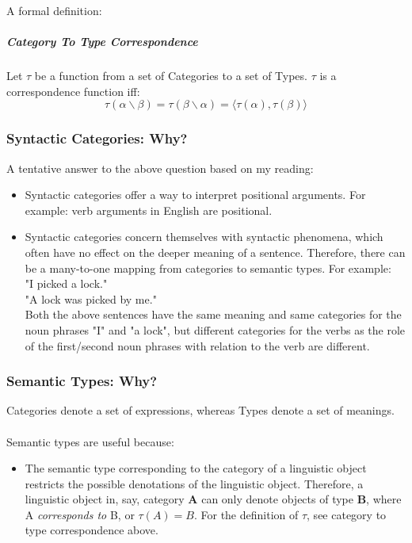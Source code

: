 \documentclass[letterpaper,12pt]{article}
\begin{document}
A formal definition:

\subparagraph{Category To Type Correspondence}
Let $\tau$ be a function from a set of Categories to a set of Types. $\tau$ is a correspondence function iff: 
\begin{equation}
\tau ( \alpha \backslash \beta ) = \tau ( \beta \backslash \alpha ) = \langle \tau ( \alpha ), \tau ( \beta ) \rangle
\end{equation}

\subsubsection{Syntactic Categories: Why?}

A tentative answer to the above question based on my reading:

\begin{itemize}
\item
Syntactic categories offer a way to interpret positional arguments. For example: verb arguments in English are positional.
\item
Syntactic categories concern themselves with syntactic phenomena, which often have no effect on the deeper meaning of a sentence. Therefore, there can be a many-to-one mapping from categories to semantic types. For example: \\
"I picked a lock." \\
"A lock was picked by me." \\
Both the above sentences have the same meaning and same categories for the noun phrases "I" and "a lock", but different categories for the verbs as the role of the first/second noun phrases with relation to the verb are different.
\end{itemize}

\subsubsection{Semantic Types: Why?}

Categories denote a set of expressions, whereas Types denote a set of meanings.
\\
\\
Semantic types are useful because:

\begin{itemize}
\item
The semantic type corresponding to the category of a linguistic object restricts the possible denotations of the linguistic object. Therefore, a linguistic object in, say, category \textbf{A} can only denote objects of type \textbf{B}, where A \emph{corresponds to} B, or $\tau ( A ) = B$. For the definition of $\tau$, see category to type correspondence above.
\end{itemize}
\end{document}
